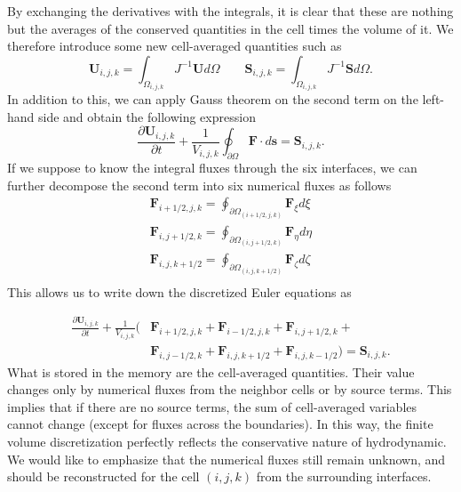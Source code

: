 By exchanging the derivatives with the integrals, it is clear that these are nothing but the averages of the conserved quantities in the cell times the volume of it. We therefore introduce some new cell-averaged quantities such as 
\begin{equation}
\mathbf{U}_{i, j, k} = \int_{\Omega_{i, j, k}} J^{-1} \mathbf{U} d \Omega \qquad \mathbf{S}_{i, j, k} = \int_{\Omega_{i, j, k}} J^{-1} \mathbf{S} d \Omega.
\end{equation}
In addition to this, we can apply Gauss theorem on the second term on the left-hand side and obtain the following expression
\begin{equation}
	\frac{\partial \mathbf{U}_{i, j, k}}{\partial t} + \frac{1}{V_{i, j, k}} \oint_{\partial \Omega} \mathbf{F} \cdot d \mathbf{s} = \mathbf{S}_{i, j, k}.
\end{equation}
If we suppose to know the integral fluxes through the six interfaces, we can further decompose the second term into six numerical fluxes as follows
\begin{equation}
\begin{split}
	\mathbf{F}_{i+ 1/2, j, k} = \oint_{\partial \Omega_{(i + 1/2, j, k)}} \mathbf{F}_{\xi} d \xi \\
	\mathbf{F}_{i, j + 1/2, k} = \oint_{\partial \Omega_{(i , j + 1/2, k)}} \mathbf{F}_{\eta} d \eta \\
	\mathbf{F}_{i, j, k + 1/2} = \oint_{\partial \Omega_{(i , j, k + 1/2)}} \mathbf{F}_{\zeta} d \zeta \\
\end{split}
\end{equation}
This allows us to write down the discretized Euler equations as 

\begin{equation}
\begin{split}
	\frac{\partial \mathbf{U}_{i, j, k}}{\partial t} + \frac{1}{V_{i, j, k}} ( & \mathbf{F}_{i + 1/2, j, k} + \mathbf{F}_{i - 1/2, j, k} +\mathbf{F}_{i , j + 1/2, k} + \\
	& \mathbf{F}_{i , j - 1/2, k} +  \mathbf{F}_{i , j, k + 1/2} + \mathbf{F}_{i , j, k - 1/2}) = \mathbf{S}_{i, j, k}.
\end{split}
\end{equation}
What is stored in the memory are the cell-averaged quantities. Their value changes only by numerical fluxes from the neighbor cells or by source terms. This implies that if there are no source terms, the sum of cell-averaged variables cannot change (except for fluxes across the boundaries). In this way, the finite volume discretization perfectly reflects the conservative nature of hydrodynamic. We would like to emphasize that the numerical fluxes still remain unknown, and should be reconstructed for the cell $(i, j, k)$ from the surrounding interfaces. 

